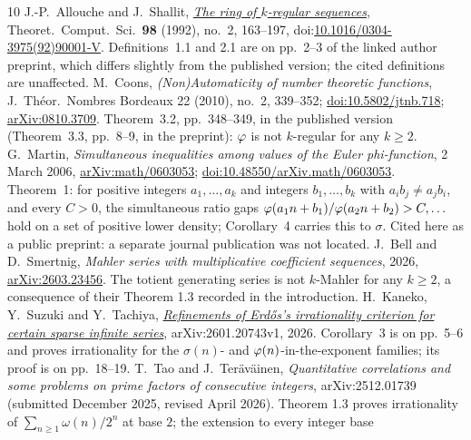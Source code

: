 \documentclass[11pt]{article}
\begin{document}
\begin{thebibliography}{10}
 J.-P.~Allouche and J.~Shallit,
  \href{https://cs.uwaterloo.ca/~shallit/Papers/as0.pdf}{\emph{The ring of
  $k$-regular sequences}}, Theoret.\ Comput.\ Sci.\ \textbf{98} (1992),
  no.~2, 163--197,
  doi:\href{https://doi.org/10.1016/0304-3975(92)90001-V}
  {10.1016/0304-3975(92)90001-V}.  Definitions~1.1 and 2.1 are on
  pp.~2--3 of the linked author preprint, which differs slightly from the
  published version; the cited definitions are unaffected.
 M.~Coons, \emph{(Non)Automaticity of number theoretic
  functions}, J.~Th\'eor.\ Nombres Bordeaux 22 (2010), no.~2, 339--352;
  \href{https://doi.org/10.5802/jtnb.718}{doi:10.5802/jtnb.718};
  \href{https://arxiv.org/abs/0810.3709}{arXiv:0810.3709}.  Theorem~3.2,
  pp.~348--349, in the published version (Theorem~3.3, pp.~8--9, in the
  preprint): $\varphi$ is not $k$-regular for any $k\ge2$.
 G.~Martin, \emph{Simultaneous inequalities
  among values of the Euler phi-function}, 2 March 2006,
  \href{https://arxiv.org/abs/math/0603053}{arXiv:math/0603053};
  \href{https://doi.org/10.48550/arXiv.math/0603053}{doi:10.48550/arXiv.math/0603053}.
  Theorem~1: for positive integers $a_1,\dots,a_k$ and integers $b_1,\dots,b_k$
  with $a_ib_j\neq a_jb_i$, and every $C>0$, the simultaneous ratio gaps
  $\varphi(a_1n+b_1)/\varphi(a_2n+b_2)>C,\dots$ hold on a set of positive lower density;
  Corollary~4 carries this to $\sigma$.  Cited here as a public preprint: a
  separate journal publication was not located.
 J.~Bell and D.~Smertnig, \emph{Mahler series with
  multiplicative coefficient sequences}, 2026,
  \href{https://doi.org/10.48550/arXiv.2603.23456}{arXiv:2603.23456}.  The
  totient generating series is not $k$-Mahler for any $k\ge2$, a consequence
  of their Theorem 1.3 recorded in the introduction.
 H.~Kaneko, Y.~Suzuki and Y.~Tachiya,
  \href{https://arxiv.org/abs/2601.20743}
  {\emph{Refinements of Erd\H{o}s's irrationality criterion for certain
  sparse infinite series}}, arXiv:2601.20743v1, 2026.
  Corollary~3 is on pp.~5--6 and proves irrationality for the
  \(\sigma(n)\)- and \(\varphi(n)\)-in-the-exponent families; its proof is on
  pp.~18--19.
 T.~Tao and J.~Ter\"av\"ainen,
  \emph{Quantitative correlations and some problems on prime factors of
  consecutive integers}, arXiv:2512.01739 (submitted December 2025, revised
  April 2026).  Theorem 1.3 proves irrationality of
  $\sum_{n\ge1}\omega(n)/2^n$ at base $2$; the extension to every integer base

\end{thebibliography}
\end{document}
